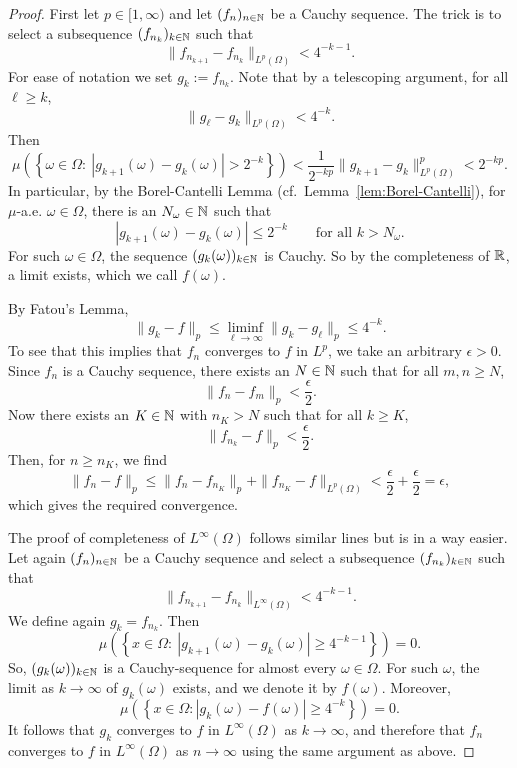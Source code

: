 \begin{proof}
First let $p \in [1,\infty)$ and let $(f_n)_{n\in\mathbb N}$ be a Cauchy sequence. The trick is to select a subsequence $(f_{n_k})_{k\in\mathbb N}$ such that 
\[
\| f_{n_{k+1}} - f_{n_k} \|_{L^p(\Omega)} < 4^{-k-1}.
\]
For ease of notation we set $g_k := f_{n_{k}}$.
Note that by a telescoping argument, for all $\ell \geq k$,
\[
\| g_\ell - g_k \|_{L^p(\Omega)} < 4^{-k}.
\]
Then
\[
\mu \left(\left\{ \omega \in \Omega : \ |g_{k+1}(\omega) - g_k(\omega) | 
> 2^{-k}  \right\} \right) < \frac{1}{2^{-k p} }\| g_{k+1} - g_k \|_{L^p(\Omega)}^p <2^{-kp}.
\]
In particular, by the Borel-Cantelli Lemma (cf.\ Lemma~\ref{lem:Borel-Cantelli}), for $\mu$-a.e. $\omega \in \Omega$, there is an $N_\omega \in \mathbb N$ such that
\[
|g_{k+1}(\omega) - g_k(\omega)| \leq 2^{-k}\qquad\text{for all $k > N_\omega$}.
\]
For such $\omega\in\Omega$, the sequence $(g_k(\omega))_{k\in\mathbb N}$ is Cauchy. So by the completeness of $\mathbb R$, a limit exists, which we call $f(\omega)$.

By Fatou's Lemma,
\[
\| g_k - f\|_p \leq \liminf_{\ell \to \infty} \| g_k - g_\ell \|_p \leq 4^{-k}.
\]
To see that this implies that $f_n$ converges to $f$ in $L^p$, we take an arbitrary $\epsilon > 0$. 
Since $f_n$ is a Cauchy sequence, there exists an $N \in \mathbb N$ such that for all $m, n \geq N$,
\[
\|f_{n} - f_m\|_{p} < \frac{\epsilon}{2}.
\]
Now there exists an $K \in \mathbb N$ with $n_K > N$ such that for all $k \geq K$,
\[
\|f_{n_k} - f \|_{p} < \frac{\epsilon}{2}.
\]
Then, for $n \geq n_K$, we find
\[
\| f_n - f \|_{p} 
\leq \| f_{n} - f_{n_{K}} \|_{p} + \|f_{n_K} - f\|_{L^p(\Omega)}  < \frac{\epsilon}{2} + \frac{\epsilon}{2} = \epsilon,
\]
which gives the required convergence.

The proof of completeness of $L^\infty(\Omega)$ follows similar lines but is in a way easier. Let again $(f_n)_{n\in\mathbb N}$ be a Cauchy sequence and select a subsequence $(f_{n_k})_{k\in\mathbb N}$ such that
\[
\| f_{n_{k+1}} - f_{n_k} \|_{L^\infty(\Omega)} < 4^{-k-1}.
\]
We define again $g_k = f_{n_k}$.
Then
\[
\mu\left( \left\{ x \in \Omega : \ |g_{k+1}(\omega) - g_k(\omega) | \geq 4^{-k-1} \right\} \right) = 0.
\]
So, $(g_k(\omega))_{k\in\mathbb N}$ is a Cauchy-sequence for almost every $\omega \in \Omega$.
For such $\omega$, the limit as $k \to \infty$ of $g_k(\omega)$ exists, and we denote it by $f(\omega)$.
Moreover, 
\[
\mu\left( \left\{ x \in \Omega : |g_k(\omega) - f(\omega)|  \geq 4^{-k} \right\} \right) = 0.
\]
It follows that $g_k$ converges to $f$ in $L^\infty(\Omega)$ as $k \to \infty$, and therefore that $f_n$ converges to $f$ in $L^\infty(\Omega)$ as $n \to \infty$ using the same argument as above.
\end{proof}

